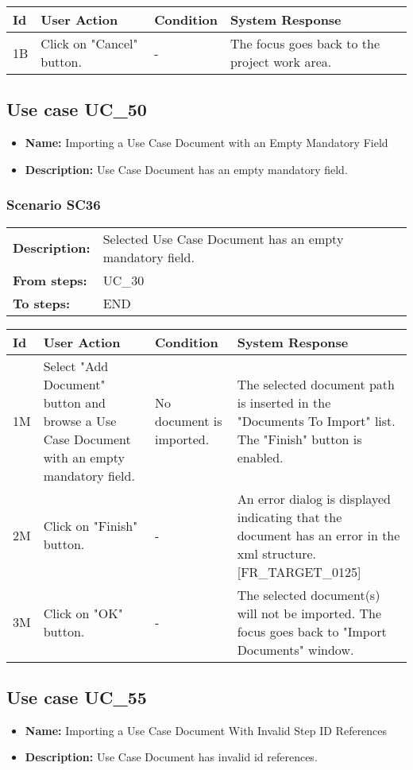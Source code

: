 \documentclass[a4paper,11pt]{article}
\newcommand{\bl}{\\ \hline}
\begin{document}
\begin{tabular}{|p{0.8in}|p{1.6in}|p{1.6in}|p{1.6in}|}
\hline
Id & User Action & Condition & System Response  \bl 
1B & Click on "Cancel" button. & - & The focus goes back to the project work area. \bl 
\end{tabular}
\subsection*{Use case UC_50}
\begin{itemize}
\item {\bf Name: }Importing a Use Case Document with an Empty Mandatory Field
			
\item {\bf Description: }Use Case Document has an empty mandatory field.
			
\end{itemize}
\subsubsection*{Scenario SC36}
\begin{tabular}{p{1in}p{4in}}
{\bf Description:} & Selected Use Case Document has an empty mandatory
					field. \\
{\bf From steps:} & UC_30#2M \\
{\bf To steps:} & END \\
\end{tabular}
 
\begin{tabular}{|p{0.8in}|p{1.6in}|p{1.6in}|p{1.6in}|}
\hline
Id & User Action & Condition & System Response  \bl 
1M & Select "Add Document" button and browse a Use Case Document
						with an empty mandatory field.  & No document is imported. & The selected document path is inserted in the "Documents
						To Import" list. The "Finish" button is enabled. \bl 
2M & Click on "Finish" button. & - & An error dialog is displayed indicating that the document
						has an error in the xml structure. [FR_TARGET_0125] \bl 
3M & Click on "OK" button. & - & The selected document(s) will not be imported. The focus
						goes back to "Import Documents" window. \bl 
\end{tabular}
\subsection*{Use case UC_55}
\begin{itemize}
\item {\bf Name: }Importing a Use Case Document With Invalid Step ID References
			
\item {\bf Description: }Use Case Document has invalid id references.
			
\end{itemize}
\end{document}
